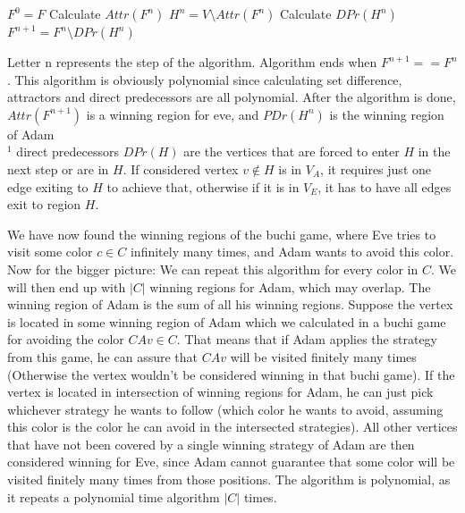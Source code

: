 \documentclass{article}
\begin{document}
\begin{algorithm}
	\begin{algorithmic}[1]
		\State $F^{0} = F$
		\State Calculate $Attr(F^n)$
		\State $H^n = V \setminus Attr(F^n)$
		\State Calculate $DPr(H^n)$
        \State $F^{n+1} = F^{n} \setminus DPr(H^n)$
		\EndWhile
	\end{algorithmic} 
\end{algorithm} 

Letter n represents the step of the algorithm. Algorithm ends when $F^{n+1} == F^n$. This algorithm is obviously polynomial since calculating set difference, attractors and direct predecessors are all polynomial. After the algorithm is done, $Attr(F^{n+1})$ is a winning region for eve, and $PDr(H^n)$ is the winning region of Adam \\

$^{1}$ direct predecessors $DPr(H)$ are the vertices that are forced to enter $H$ in the next step or are in $H$. If considered vertex $v \not\in H$ is in $V_{A}$, it requires just one edge exiting to $H$ to achieve that, otherwise if it is in $V_{E}$, it has to have all edges exit to region $H$.

\newpage

We have now found the winning regions of the buchi game, where Eve tries to visit some color $c \in C$ infinitely many times, and Adam wants to avoid this color. Now for the bigger picture: We can repeat this algorithm for every color in $C$. We will then end up with $|C|$ winning regions for Adam, which may overlap. The winning region of Adam is the sum of all his winning regions. Suppose the vertex is located in some winning region of Adam which we calculated in a buchi game for avoiding the color $CAv \in C$. That means that if Adam applies the strategy from this game, he can assure that $CAv$ will be visited finitely many times (Otherwise the vertex wouldn't be considered winning in that buchi game). If the vertex is located in intersection of winning regions for Adam, he can just pick whichever strategy he wants to follow (which color he wants to avoid, assuming this color is the color he can avoid in the intersected strategies). All other vertices that have not been covered by a single winning strategy of Adam are then considered winning for Eve, since Adam cannot guarantee that some color will be visited finitely many times from those positions. The algorithm is polynomial, as it repeats a polynomial time algorithm $|C|$ times.
\end{document}
